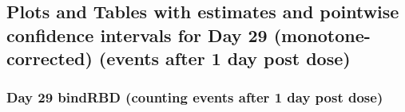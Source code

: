 \documentclass[]{article}
\begin{document}
\clearpage
\clearpage

\hypertarget{plots-and-tables-with-estimates-and-pointwise-confidence-intervals-for-day-29-monotone-corrected-events-after-1-day-post-dose}{%
\subsection{Plots and Tables with estimates and pointwise confidence
intervals for Day 29 (monotone-corrected) (events after 1 day post
dose)}\label{plots-and-tables-with-estimates-and-pointwise-confidence-intervals-for-day-29-monotone-corrected-events-after-1-day-post-dose}}

\clearpage

\hypertarget{day-29-bindrbd-counting-events-after-1-day-post-dose}{%
\subsubsection{Day 29 bindRBD (counting events after 1 day post
dose)}\label{day-29-bindrbd-counting-events-after-1-day-post-dose}}
\end{document}
